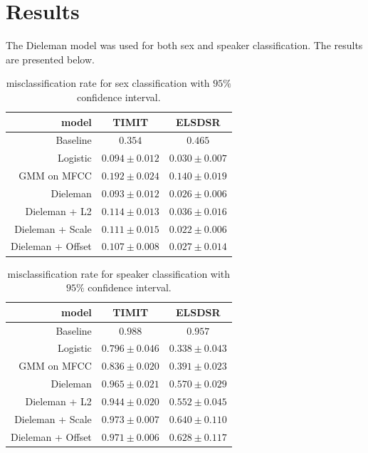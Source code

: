 \section{Results}

The Dieleman model was used for both sex and speaker classification. The results are presented below.

\begin{table}[H]
\centering
\begin{tabular}{r|c|c}
model & TIMIT & ELSDSR \\ \hline
                    Baseline & $0.354$ & $0.465$ \\
                    Logistic & $0.094 \pm 0.012$ & $0.030 \pm 0.007$ \\
                 GMM on MFCC & $0.192 \pm 0.024$ & $0.140 \pm 0.019$ \\
                    Dieleman & $0.093 \pm 0.012$ & $0.026 \pm 0.006$ \\
     Dieleman + L2 & $0.114 \pm 0.013$ & $0.036 \pm 0.016$ \\
  Dieleman + Scale & $0.111 \pm 0.015$ & $0.022 \pm 0.006$ \\
 Dieleman + Offset & $0.107 \pm 0.008$ & $0.027 \pm 0.014$ \\
\end{tabular}
\caption{misclassification rate for sex classification with $95\%$ confidence interval.}
\label{tab:results-sex}
\end{table}

\begin{table}[H]
\centering
\begin{tabular}{r|c|c}
model & TIMIT & ELSDSR \\ \hline
                    Baseline & $0.988$ & $0.957$ \\
                    Logistic & $0.796 \pm 0.046$ & $0.338 \pm 0.043$ \\
                 GMM on MFCC & $0.836 \pm 0.020$ & $0.391 \pm 0.023$ \\
                    Dieleman & $0.965 \pm 0.021$ & $0.570 \pm 0.029$ \\
     Dieleman + L2 & $0.944 \pm 0.020$ & $0.552 \pm 0.045$ \\
  Dieleman + Scale & $0.973 \pm 0.007$ & $0.640 \pm 0.110$ \\
 Dieleman + Offset & $0.971 \pm 0.006$ & $0.628 \pm 0.117$ \\
\end{tabular}
\caption{misclassification rate for speaker classification with $95\%$ confidence interval.}
\label{tab:results-speaker}
\end{table}

